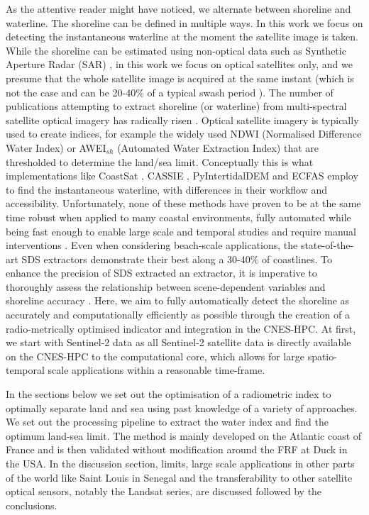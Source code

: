 \documentclass[remotesensing,technicalnote,submit,pdftex,moreauthors]{Definitions/mdpi}
\begin{document}
As the attentive reader might have noticed, we alternate between shoreline and waterline. The shoreline can be defined in multiple ways. In this work we focus on detecting the instantaneous waterline at the moment the satellite image is taken. While the shoreline can be estimated using non-optical data such as Synthetic Aperture Radar (SAR) \citep{Wu:2019, Tajima:2019, Tajima:2021}
, in this work we focus on optical satellites only, and we presume that the whole satellite image is acquired at the same instant (which is not the case and can be 20-40\% of a typical swash period \citep{binet2022accurate}). The number of publications attempting to extract shoreline (or waterline) from multi-spectral satellite optical imagery has radically risen \citep{MCALLISTER2022}. Optical satellite imagery is typically used to create indices, for example the widely used NDWI (Normalised Difference Water Index) or AWEI$_{sh}$ (Automated Water Extraction Index) that are thresholded to determine the land/sea limit. Conceptually this is what implementations like CoastSat \citep{VOS2019_google}, CASSIE \citep{ALMEIDA2021_Cassie}, PyIntertidalDEM \citep{Khan2019} and ECFAS \cite{Irazoqui:2023} employ to find the instantaneous waterline, with differences in their workflow and accessibility. Unfortunately, none of these methods have proven to be at the same time robust when applied to many coastal environments, fully automated while being fast enough to enable large scale and temporal studies and require manual interventions \citep{MCALLISTER2022}. Even when considering beach-scale applications, the state-of-the-art SDS extractors demonstrate their best along a 30-40\% of coastlines. To enhance the precision of SDS extracted an extractor, it is imperative to thoroughly assess the relationship between scene-dependent variables and shoreline accuracy \citep{PUCINO:2022}. Here, we aim to fully automatically detect the shoreline as accurately and computationally efficiently as possible through the creation of a radio-metrically optimised indicator and integration in the CNES-HPC. At first, we start with Sentinel-2 data as all Sentinel-2 satellite data is directly available on the CNES-HPC to the computational core, which allows for large spatio-temporal scale applications within a reasonable time-frame.

In the sections below we set out the optimisation of a radiometric index to optimally separate land and sea using past knowledge of a variety of approaches. We set out the processing pipeline to extract the water index and find the optimum land-sea limit. The method is mainly developed on the Atlantic coast of France and is then validated without modification around the FRF at Duck in the USA. In the discussion section, limits, large scale applications in other parts of the world like Saint Louis in Senegal and the transferability to other satellite optical sensors, notably the Landsat series, are discussed followed by the conclusions.
\end{document}
